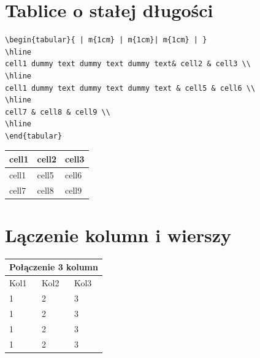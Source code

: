 \documentclass[table]{beamer}
\begin{document}
\section{Tablice o stałej długości}

\begin{frame}[fragile]
\begin{lstlisting}
\begin{tabular}{ | m{1cm} | m{1cm}| m{1cm} | } 
\hline
cell1 dummy text dummy text dummy text& cell2 & cell3 \\ 
\hline
cell1 dummy text dummy text dummy text & cell5 & cell6 \\ 
\hline
cell7 & cell8 & cell9 \\ 
\hline
\end{tabular}
\end{lstlisting}
\end{frame}

\begin{frame}
 \begin{center}
\begin{tabular}{ | m{2cm} | m{1cm}| m{3cm} | } 
\hline
cell1 & cell2 & cell3 \\ 
\hline
cell1 & cell5 & cell6 \\ 
\hline
cell7 & cell8 & cell9 \\ 
\hline
\end{tabular}
\end{center}
\end{frame}

\section{Lączenie kolumn i wierszy}



\begin{frame}
\begin{center}
\begin{tabular}{ |p{2cm}|p{2cm}|p{2cm}|  }
 \hline
 \multicolumn{3}{|c|}{Połączenie 3 kolumn} \\
 \hline
 Kol1&Kol2&Kol3\\
 \hline
 1 & 2 & 3\\
 1 & 2 & 3\\
 1 & 2 & 3\\
 1 & 2 & 3\\
 \hline
\end{tabular}
\end{center}
\end{frame}
\end{document}

